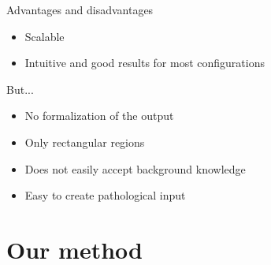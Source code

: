 \documentclass[10pt]{beamer}
\begin{document}
\begin{frame}{Advantages and disadvantages}
    \begin{itemize}
        \item Scalable
        \item Intuitive and good results for most configurations
    \end{itemize}
    But...
    \begin{itemize}
        \item No formalization of the output
        \item Only rectangular regions
        \item Does not easily accept background knowledge
        \item Easy to create pathological input
    \end{itemize}
\end{frame}

\section{Our method}
\end{document}
